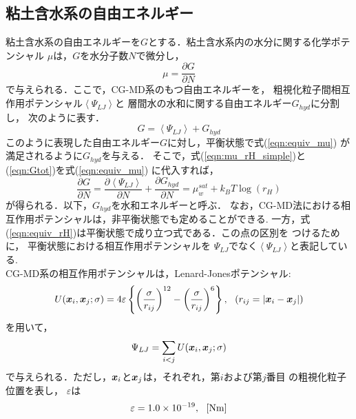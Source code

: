 \subsection{粘土含水系の自由エネルギー}
粘土含水系の自由エネルギーを$G$とする．粘土含水系内の水分に関する化学ポテンシャル
$\mu$は，$G$を水分子数$N$で微分し，
\begin{equation}
	\mu=\frac{\partial G}{\partial N}
	\label{eqn:mu_GN}
\end{equation}
で与えられる．ここで，CG-MD系のもつ自由エネルギーを，
粗視化粒子間相互作用ポテンシャル$\left<\Psi_{LJ}\right>$と
層間水の水和に関する自由エネルギー$G_{hyd}$に分割し，
次のように表す．
\begin{equation}
	G=\left< \Psi_{LJ} \right> +G_{hyd}
	\label{eqn:Gtot}
\end{equation}
このように表現した自由エネルギー$G$に対し，平衡状態で式(\ref{eqn:equiv_mu})
が満足されるように$G_{hyd}$を与える．
そこで，式(\ref{eqn:mu_rH_simple})と(\ref{eqn:Gtot})を式(\ref{eqn:equiv_mu})
に代入すれば，
\begin{equation}
	\frac{\partial G}{\partial N}
	=
	\frac{\partial \left< \Psi_{LJ}\right>}{\partial N}
	+
	\frac{\partial G_{hyd}}{\partial N}
	=
	\mu_w^{sat} +k_BT \log
	\left(
		r_H
	\right)
	\label{eqn:equiv_rH}
\end{equation}
が得られる．以下，$G_{hyd}$を水和エネルギーと呼ぶ．
なお，CG-MD法における相互作用ポテンシャルは，非平衡状態でも定めることができる.
一方，式(\ref{eqn:equiv_rH})は平衡状態で成り立つ式である．この点の区別を
つけるために，
平衡状態における相互作用ポテンシャルを
$\Psi_{LJ}$でなく$\left< \Psi_{LJ}\right>$と表記している. \\
\hspace{\parindent}
CG-MD系の相互作用ポテンシャルは，Lenard-Jonesポテンシャル:
\begin{equation}
	U(\mbox{\boldmath $x$}_i,\mbox{\boldmath $x$}_j; \sigma) 
	= 4 \varepsilon 
	\left\{ 
	\left(\frac{\sigma}{r_{ij}}\right)^{12}
	-
	\left(\frac{\sigma}{r_{ij}}\right)^6
	\right\}, \ \ \left( r_{ij}=\left| \mbox{\boldmath $x$}_i-\mbox{\boldmath $x$}_j\right| \right)
	\label{eqn:LJ}
\end{equation}
を用いて，
\begin{equation}
	\Psi_{LJ}=\sum_{i<j} U(\mbox{\boldmath $x$}_i,\mbox{\boldmath $x$}_j; \sigma) 
	\label{eqn:def_PsiLJ}
\end{equation}
で与えられる．ただし，$\mbox{\boldmath $x$}_i$と$\mbox{\boldmath $x$}_j$は，それぞれ，第$i$および第$j$番目
の粗視化粒子位置を表し，
$\varepsilon$は
\begin{equation}
	\varepsilon=1.0\times 10^{-19}, \ \ [{\rm Nm}]
	\label{eqn:eps_of_LJ}
\end{equation}
